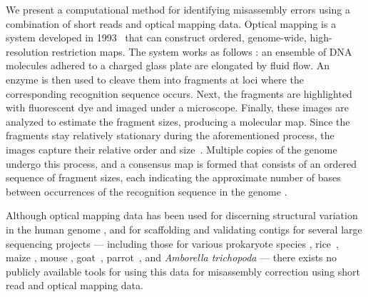    

We present a computational method for identifying misassembly errors using a combination of short reads and optical mapping data.   Optical mapping is a system developed in 1993~\cite{schwartz93} that can construct ordered, genome-wide, high-resolution restriction maps.  The system works as follows \cite{ORMenc,microfluidic}: an ensemble of DNA molecules adhered to a charged glass plate are elongated by fluid flow.   An enzyme is then used to cleave them into fragments at loci where the corresponding recognition sequence occurs. Next, the fragments are highlighted with fluorescent dye and imaged under a microscope. Finally, these images are analyzed to estimate the fragment sizes, producing a molecular map. Since the fragments stay relatively stationary during the aforementioned process, the images capture their relative order and size~\cite{Neely11}.   Multiple copies of the genome undergo this process, and a consensus map is formed that consists of an ordered sequence of fragment sizes, each indicating the approximate number of bases between occurrences of the recognition sequence in the genome \cite{Anantharaman01}.  

Although optical mapping data has been used for discerning structural variation in the human genome  \cite{teague}, and for scaffolding and validating contigs for several large sequencing projects --- including those for various prokaryote species \cite{reslewic,zhou,zhou2}, rice~\cite{RICE}, maize \cite{Zhou09}, mouse \cite{church}, goat~\cite{GOAT}, parrot~\cite{gigadb}, and {\em Amborella trichopoda} \cite{amborella} --- there exists no publicly available tools for using this data for misassembly correction using short read and optical mapping data.

